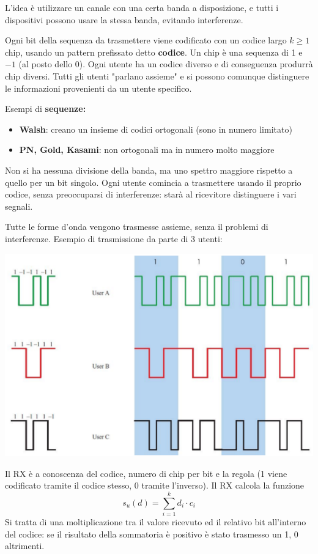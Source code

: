 L'idea è utilizzare un canale con una certa banda a disposizione, e tutti i dispositivi possono usare la stessa banda, evitando interferenze.

Ogni bit della sequenza da trasmettere viene codificato con un codice largo $k \geq 1$ chip, usando un pattern prefissato detto \textbf{codice}. Un chip è una sequenza di 1 e $-1$ (al posto dello $0$). Ogni utente ha un codice diverso e di conseguenza produrrà chip diversi. Tutti gli utenti "parlano assieme" e si possono comunque distinguere le informazioni provenienti da un utente specifico.

Esempi di \textbf{sequenze:}
\begin{itemize}
    \item \textbf{Walsh}: creano un insieme di codici ortogonali (sono in numero limitato)
    
    \item \textbf{PN, Gold, Kasami}: non ortogonali ma in numero molto maggiore
\end{itemize}

Non si ha nessuna divisione della banda, ma uno spettro maggiore rispetto a quello per un bit singolo. Ogni utente comincia a trasmettere usando il proprio codice, senza preoccuparsi di interferenze: starà al ricevitore distinguere i vari segnali. 

Tutte le forme d'onda vengono trasmesse assieme, senza il problemi di interferenze. Esempio di trasmissione da parte di 3 utenti:
\begin{center}
	\includegraphics[width=0.7\linewidth]{img/wireless/CDMA1}
\end{center}

Il RX è a conoscenza del codice, numero di chip per bit e la regola (1 viene codificato tramite il codice stesso, 0 tramite l'inverso). Il RX calcola la funzione
$$ s_u (d) = \sum_{i=1}^{k} d_i \cdot c_i $$ 
Si tratta di una moltiplicazione tra il valore ricevuto ed il relativo bit all'interno del codice: se il risultato della sommatoria è positivo è stato trasmesso un 1, 0 altrimenti.

